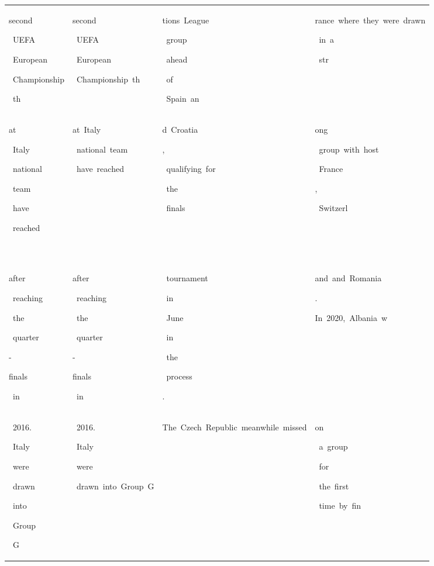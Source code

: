 \begin{table}[h]
\begin{tabular}{ l | l | l | l }
 \colorbox{cm_6!40}{\strut second}\colorbox{cm_18!40}{\strut \ UEFA}\colorbox{cm_31!40}{\strut \ European}\colorbox{cm_19!40}{\strut \ Championship}\colorbox{cm_21!40}{\strut \ th} & \colorbox{cm_25!40}{\strut second}\colorbox{cm_12!40}{\strut \ UEFA}\colorbox{cm_25!40}{\strut \ European}\colorbox{cm_12!40}{\strut \ Championship\ th} & \colorbox{cm_0!40}{\strut tions\ League}\colorbox{cm_12!40}{\strut \ group}\colorbox{cm_0!40}{\strut \ ahead}\colorbox{cm_12!40}{\strut \ of}\colorbox{cm_0!40}{\strut \ Spain\ an} & \colorbox{cm_0!40}{\strut rance\ where\ they\ were\ drawn}\colorbox{cm_12!40}{\strut \ in\ a}\colorbox{cm_0!40}{\strut \ str} \\ 
 \colorbox{cm_21!40}{\strut at}\colorbox{cm_25!40}{\strut \ Italy}\colorbox{cm_52!40}{\strut \ national}\colorbox{cm_32!40}{\strut \ team}\colorbox{cm_1!40}{\strut \ have}\colorbox{cm_26!40}{\strut \ reached}\colorbox{cm_35!40}{\strut \ } & \colorbox{cm_12!40}{\strut at\ Italy}\colorbox{cm_25!40}{\strut \ national\ team}\colorbox{cm_12!40}{\strut \ have\ reached\ } & \colorbox{cm_0!40}{\strut d\ Croatia}\colorbox{cm_12!40}{\strut ,}\colorbox{cm_0!40}{\strut \ qualifying\ for}\colorbox{cm_12!40}{\strut \ the}\colorbox{cm_0!40}{\strut \ finals} & \colorbox{cm_0!40}{\strut ong}\colorbox{cm_12!40}{\strut \ group\ with\ host}\colorbox{cm_0!40}{\strut \ France}\colorbox{cm_12!40}{\strut ,}\colorbox{cm_0!40}{\strut \ Switzerl} \\ 
 \colorbox{cm_35!40}{\strut after}\colorbox{cm_6!40}{\strut \ reaching}\colorbox{cm_32!40}{\strut \ the}\colorbox{cm_8!40}{\strut \ quarter}\colorbox{cm_32!40}{\strut -}\colorbox{cm_31!40}{\strut finals}\colorbox{cm_37!40}{\strut \ in} & \colorbox{cm_12!40}{\strut after}\colorbox{cm_0!40}{\strut \ reaching}\colorbox{cm_12!40}{\strut \ the}\colorbox{cm_0!40}{\strut \ quarter}\colorbox{cm_12!40}{\strut -}\colorbox{cm_0!40}{\strut finals}\colorbox{cm_12!40}{\strut \ in} & \colorbox{cm_0!40}{\strut \ tournament}\colorbox{cm_12!40}{\strut \ in}\colorbox{cm_0!40}{\strut \ June}\colorbox{cm_12!40}{\strut \ in}\colorbox{cm_25!40}{\strut \ the}\colorbox{cm_0!40}{\strut \ process}\colorbox{cm_12!40}{\strut .}\colorbox{cm_0!40}{\strut } & \colorbox{cm_0!40}{\strut and\ and\ Romania}\colorbox{cm_12!40}{\strut .}\colorbox{cm_0!40}{\strut In\ 2020,\ Albania\ w} \\ 
 \colorbox{cm_40!40}{\strut \ 2016.}\colorbox{cm_54!40}{\strut \ Italy}\colorbox{cm_30!40}{\strut \ were}\colorbox{cm_23!40}{\strut \ drawn}\colorbox{cm_29!40}{\strut \ into}\colorbox{cm_30!40}{\strut \ Group}\colorbox{cm_7!40}{\strut \ G} & \colorbox{cm_0!40}{\strut \ 2016.}\colorbox{cm_12!40}{\strut \ Italy}\colorbox{cm_25!40}{\strut \ were}\colorbox{cm_0!40}{\strut \ drawn\ into\ Group\ G} & \colorbox{cm_0!40}{\strut The\ Czech\ Republic\ meanwhile\ missed} & \colorbox{cm_0!40}{\strut on}\colorbox{cm_12!40}{\strut \ a\ group}\colorbox{cm_0!40}{\strut \ for}\colorbox{cm_12!40}{\strut \ the\ first}\colorbox{cm_0!40}{\strut \ time\ by\ fin} \\ 

\end{tabular}
\end{table}
